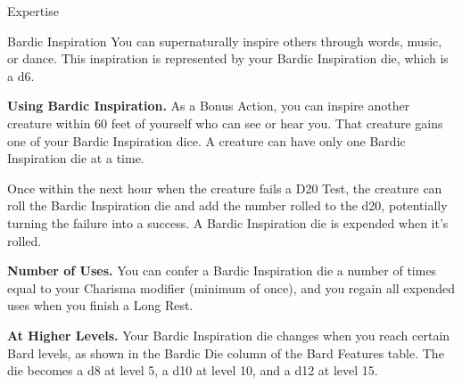 {\footnotesize \dagger Expertise}
\newpage


\begin{Card}{Bardic Inspiration}
You can supernaturally inspire others through words, music, or dance. This inspiration is represented by your Bardic Inspiration die, which is a d6.

\textbf{Using Bardic Inspiration.} As a Bonus Action, you can inspire another creature within 60 feet of yourself who can see or hear you. That creature gains one of your Bardic Inspiration dice. A creature can have only one Bardic Inspiration die at a time.

Once within the next hour when the creature fails a D20 Test, the creature can roll the Bardic Inspiration die and add the number rolled to the d20, potentially turning the failure into a success. A Bardic Inspiration die is expended when it’s rolled.

\textbf{Number of Uses.} You can confer a Bardic Inspiration die a number of times equal to your Charisma modifier (minimum of once), and you regain all expended uses when you finish a Long Rest.

\textbf{At Higher Levels.} Your Bardic Inspiration die changes when you reach certain Bard levels, as shown in the Bardic Die column of the Bard Features table. The die becomes a d8 at level 5, a d10 at level 10, and a d12 at level 15.
\end{Card}


